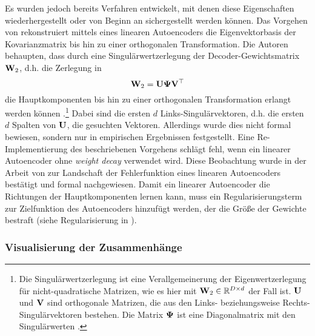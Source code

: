 Es wurden jedoch bereits Verfahren entwickelt, mit denen diese Eigenschaften wiederhergestellt oder
von Beginn an sichergestellt werden können. Das Vorgehen von \textcite{Plaut.2018} rekonstruiert
mittels eines linearen Autoencoders die Eigenvektorbasis der Kovarianzmatrix bis hin zu einer
orthogonalen Transformation. Die Autoren behaupten, dass durch eine Singulärwertzerlegung der
Decoder-Gewichtsmatrix $\mathbf{W}_2$, d.h. die Zerlegung in
\begin{equation}
	\label{eq:SVD}
	\mathbf{W}_2 = \mathbf{U} \mathbf{\Psi} \mathbf{V}^\top
\end{equation}
die Hauptkomponenten bis hin zu einer orthogonalen Transformation erlangt werden können \parencite[4]{Plaut.2018}.\footnote{Die Singulärwertzerlegung ist eine Verallgemeinerung der
	Eigenwertzerlegung für nicht-quadratische Matrizen, wie es hier mit $\mathbf{W}_2 \in \mathbb{R}^{D \times
			d}$ der Fall ist. $\mathbf{U}$ und $\mathbf{V}$ sind orthogonale Matrizen, die aus den Links-
	beziehungsweise Rechts-Singulärvektoren bestehen. Die Matrix $\mathbf{\Psi}$ ist eine Diagonalmatrix
	mit den Singulärwerten \parencite[44 -- 45]{Goodfellow.2016}. } Dabei sind die ersten $d$ Links-Singulärvektoren, d.h. die
ersten $d$ Spalten von $\mathbf{U}$, die gesuchten Vektoren. Allerdings wurde dies nicht formal
bewiesen, sondern nur in empirischen Ergebnissen festgestellt. Eine Re-Implementierung des
beschriebenen Vorgehens schlägt fehl, wenn ein linearer Autoencoder ohne \textit{weight decay}
verwendet wird. Diese Beobachtung wurde in der Arbeit von \textcite{Kunin.2019} zur Landschaft der
Fehlerfunktion eines linearen Autoencoders bestätigt und formal nachgewiesen. Damit ein linearer
Autoencoder die Richtungen der Hauptkomponenten lernen kann, muss ein Regularisierungsterm zur
Zielfunktion des Autoencoders hinzufügt werden, der die Größe der Gewichte bestraft (siehe
Regularisierung in ).

\subsubsection{Visualisierung der Zusammenhänge}


